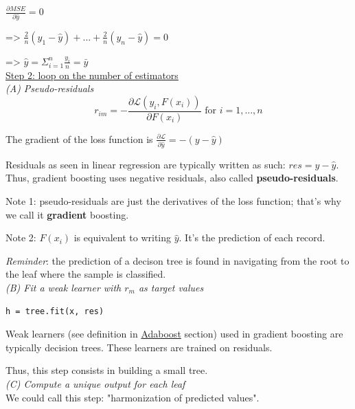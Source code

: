 $\frac{\partial MSE}{\partial \hat y} = 0$

=> $\frac{2}{n}(y_1 - \hat y) + ... + \frac{2}{n}(y_n - \hat y) = 0$

=> $\hat y = \Sigma_{i=1}^n \frac{y_i}{n} = \bar y$ \\

\underline{Step 2: loop on the number of estimators} \\

\textit{(A) Pseudo-residuals} \\

$$r_{im} = - \frac{\partial \mathcal{L}(y_i, F(x_i))}{\partial F(x_i)} \text{ for } i=1,...,n$$

The gradient of the loss function is $\frac{\partial \mathcal{L}}{\partial \hat y} = -(y - \hat y)$

Residuals as seen in linear regression are typically written as such: $res = y - \hat y$. Thus, gradient boosting uses negative residuals, also called \textbf{pseudo-residuals}. 

Note 1: pseudo-residuals are just the derivatives of the loss function; that's why we call it \textbf{gradient} boosting.

Note 2: $F(x_i)$ is equivalent to writing $\hat y$. It's the prediction of each record.

\textit{Reminder}:  the prediction of a decison tree is found in navigating from the root to the leaf where the sample is classified.  \\

\textit{(B) Fit a weak learner with $r_m$ as target values} \\

\lstset{language=Python}
\lstset{frame=lines}
\lstset{basicstyle=\footnotesize}
\begin{lstlisting}
h = tree.fit(x, res)
\end{lstlisting}

Weak learners (see definition in \hyperref[sec:adaboost]{Adaboost} section) used in gradient boosting are typically decision trees. These learners are trained on residuals. 

Thus, this step consists in building a small tree. \\

\textit{(C) Compute a unique output for each leaf} \\

We could call this step: "harmonization of predicted values". \\

